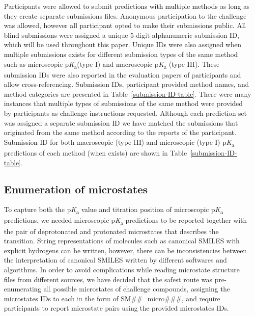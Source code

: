 \documentclass[9pt,lineno,final]{elife}
\newcommand{\pKa}{p\textit{K}\textsubscript{a}}
\begin{document}
Participants were allowed to submit predictions with multiple methods as long as they create separate submissions files. Anonymous participation to the challenge was allowed, however all participant opted to make their submissions public.
All blind submissions were assigned a unique 5-digit alphanumeric submission ID, which will be used throughout this paper. Unique IDs were also assigned when multiple submissions exists for different submission types of the same method such as microscopic \pKa{}(type I) and macroscopic \pKa{} (type III). 
These submission IDs were also reported in the evaluation papers of participants and allow cross-referencing. Submission IDs, participant provided method names, and method categories are presented in Table~\ref{submission-ID-table}. 
There were many instances that multiple types of submissions of the same method were provided by participants as challenge instructions requested. 
Although each prediction set was assigned a separate submission ID we have matched the submissions that originated from the same method according to the reports of the participant.
Submission ID for both macroscopic (type III) and microscopic (type I) \pKa{} predictions of each method (when exists) are shown in Table~\ref{submission-ID-table}. 





\subsection{Enumeration of microstates} \label{section-enumeration-of-microstates}

To capture both the \pKa{} value and titration position of microscopic \pKa{} predictions, we needed microscopic \pKa{} predictions to be reported together with the pair of deprotonated and protonated microstates that describes the transition. 
String representations of molecules such as canonical SMILES with explicit hydrogens can be written, however, there can be inconsistencies between the interpretation of canonical SMILES written by different softwares and algorithms.
In order to avoid complications while reading microstate structure files from different sources, we have decided that the safest route was pre-enumerating all possible microstates of challenge compounds, assigning the microstates IDs to each in the form of SM\#\#\_micro\#\#\#, and require participants to report microstate pairs using the provided microstates IDs.   
\end{document}
